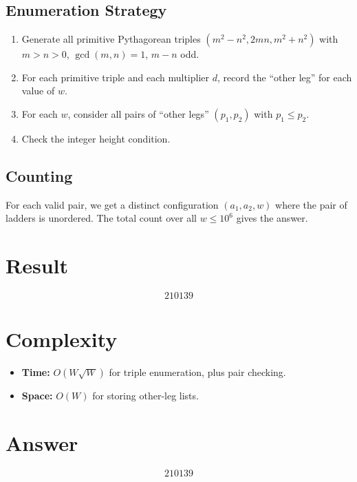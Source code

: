 \documentclass[12pt]{article}
\theoremstyle{definition}
\begin{document}
\subsection{Enumeration Strategy}
\begin{enumerate}
    \item Generate all primitive Pythagorean triples $(m^2 - n^2, 2mn, m^2+n^2)$ with $m > n > 0$, $\gcd(m,n) = 1$, $m - n$ odd.
    \item For each primitive triple and each multiplier $d$, record the ``other leg'' for each value of $w$.
    \item For each $w$, consider all pairs of ``other legs'' $(p_1, p_2)$ with $p_1 \leq p_2$.
    \item Check the integer height condition.
\end{enumerate}

\subsection{Counting}
For each valid pair, we get a distinct configuration $(a_1, a_2, w)$ where the pair of ladders is unordered. The total count over all $w \leq 10^6$ gives the answer.

\section{Result}
\[
    \boxed{210139}
\]

\section{Complexity}
\begin{itemize}
    \item \textbf{Time:} $O(W\sqrt{W})$ for triple enumeration, plus pair checking.
    \item \textbf{Space:} $O(W)$ for storing other-leg lists.
\end{itemize}

\section{Answer}

\[
\boxed{210139}
\]
\end{document}
